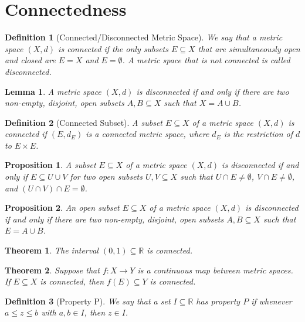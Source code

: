 \documentclass{article}
\newtheorem{definition}{Definition}
\newtheorem{lemma}{Lemma}
\newtheorem{proposition}{Proposition}
\newtheorem{theorem}{Theorem}
\begin{document}
\section*{Connectedness}

\begin{definition}[Connected/Disconnected Metric Space]
We say that a metric space $(X, d)$ is connected if the only subsets $E \subseteq X$ that are simultaneously open and closed are $E = X$ and $E = \emptyset$. A metric space that is not connected is called disconnected.
\end{definition}

\begin{lemma}
A metric space $(X, d)$ is disconnected if and only if there are two non-empty, disjoint, open subsets $A, B \subseteq X$ such that $X = A \cup B$.
\end{lemma}

\begin{definition}[Connected Subset]
A subset $E \subseteq X$ of a metric space $(X, d)$ is connected if $(E, d_E)$ is a connected metric space, where $d_E$ is the restriction of $d$ to $E \times E$.
\end{definition}

\begin{proposition}
A subset $E \subseteq X$ of a metric space $(X, d)$ is disconnected if and only if $E \subseteq U \cup V$ for two open subsets $U, V \subseteq X$ such that $U \cap E \neq \emptyset$, $V \cap E \neq \emptyset$, and $(U \cap V) \cap E = \emptyset$.
\end{proposition}

\begin{proposition}
An open subset $E \subseteq X$ of a metric space $(X, d)$ is disconnected if and only if there are two non-empty, disjoint, open subsets $A, B \subseteq X$ such that $E = A \cup B$.
\end{proposition}

\begin{theorem}
The interval $(0, 1) \subseteq \mathbb{R}$ is connected.
\end{theorem}

\begin{theorem}
Suppose that $f : X \to Y$ is a continuous map between metric spaces. If $E \subseteq X$ is connected, then $f(E) \subseteq Y$ is connected.
\end{theorem}

\begin{definition}[Property P]
We say that a set $I \subseteq \mathbb{R}$ has property $P$ if whenever $a \leq z \leq b$ with $a, b \in I$, then $z \in I$.
\end{definition}
\end{document}
